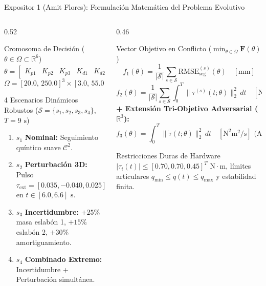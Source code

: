 \documentclass[aspectratio=169,10pt]{beamer}
\begin{document}
\begin{frame}{Expositor 1 (Amit Flores): Formulación Matemática del Problema Evolutivo}
\begin{columns}[T,onlytextwidth]
\begin{column}{0.52\textwidth}
    \begin{block}{Cromosoma de Decisión ($\theta \in \Omega \subset \mathbb{R}^6$)}
        \[
            \theta = \begin{bmatrix} K_{p1} & K_{p2} & K_{p3} & K_{d1} & K_{d2} & K_{d3} \end{bmatrix}^T
        \]
        \[
            \Omega = [20.0,\, 250.0]^3 \times [3.0,\, 55.0]^3 \subset \mathbb{R}^6
        \]
    \end{block}
    \begin{exampleblock}{4 Escenarios Dinámicos Robustos ($\mathcal{S} = \{s_1,s_2,s_3,s_4\}$, $T=9\text{ s}$)}
        \begin{enumerate}
            \item $s_1$ \textbf{Nominal:} Seguimiento quíntico suave $\mathcal{C}^2$.
            \item $s_2$ \textbf{Perturbación 3D:} Pulso $\tau_{\text{ext}} = [0.035, -0.040, 0.025]^T\text{ N}\cdot\text{m}$ en $t \in [6.0, 6.6]\text{ s}$.
            \item $s_3$ \textbf{Incertidumbre:} $+25\%$ masa eslabón 1, $+15\%$ eslabón 2, $+30\%$ amortiguamiento.
            \item $s_4$ \textbf{Combinado Extremo:} Incertidumbre + Perturbación simultánea.
        \end{enumerate}
    \end{exampleblock}
\end{column}
\begin{column}{0.46\textwidth}
    \begin{block}{Vector Objetivo en Conflicto ($\min_{\theta \in \Omega} \mathbf{F}(\theta)$)}
        \[
            f_1(\theta) = \frac{1}{|\mathcal{S}|}\sum_{s \in \mathcal{S}} \text{RMSE}_{\text{seg}}^{(s)}(\theta) \quad [\text{mm}]
        \]
        \[
            f_2(\theta) = \frac{1}{|\mathcal{S}|}\sum_{s \in \mathcal{S}} \int_0^T \|\tau^{(s)}(t;\theta)\|_2^2\,dt \quad [\text{N}^2\text{m}^2\text{s}]
        \]
        \textbf{+ Extensión Tri-Objetivo Adversarial ($\mathbb{R}^3$):}
        \[
            f_3(\theta) = \int_0^T \|\dot{\tau}(t;\theta)\|_2^2\,dt \quad [\text{N}^2\text{m}^2/\text{s}] \text{ (Anti-Chattering)}
        \]
    \end{block}
    \begin{alertblock}{Restricciones Duras de Hardware}
        $|\tau_i(t)| \le [0.70, 0.70, 0.45]^T\text{ N}\cdot\text{m}$, límites articulares $q_{\min} \le q(t) \le q_{\max}$ y estabilidad finita.
    \end{alertblock}
\end{column}
\end{columns}
\end{frame}
\end{document}
